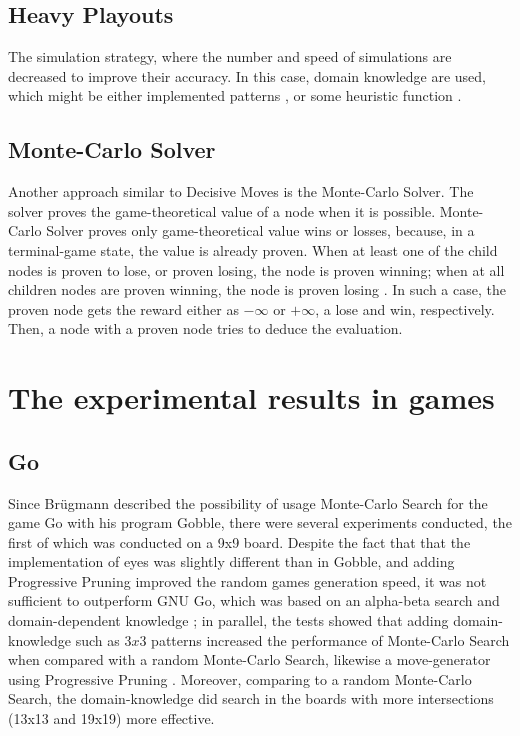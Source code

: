\documentclass[paper=8.27in:11.69in]{scrartcl}
\begin{document}
\subsection{Heavy Playouts}
The simulation strategy, where the number and speed of simulations are decreased to improve their accuracy. In this case, domain knowledge are used, which might be either implemented patterns \cite{Wang2007ModificationsOU}, or some heuristic function \cite{Winands2009EvaluationFB}.\\
\subsection{Monte-Carlo Solver}
Another approach similar to Decisive Moves is the Monte-Carlo Solver. The solver proves the game-theoretical value of a node when it is possible. Monte-Carlo Solver proves only game-theoretical value wins or losses, because, in a terminal-game state, the value is already proven. When at least one of the child nodes is proven to lose, or proven losing, the node is proven winning; when at all children nodes are proven winning, the node is proven losing \cite{WinandsBS08}. In such a case, the proven node gets the reward either as $-\infty$ or $+\infty$, a lose and win, respectively. Then, a node with a proven node tries to deduce the evaluation.\\
\section{The experimental results in games}
\subsection{Go}
Since Brügmann \cite{MaxPlanck1993MonteCG} described the possibility of usage Monte-Carlo Search for the game Go with his program Gobble, there were several experiments conducted, the first of which was conducted on a 9x9 board. Despite the fact that that the implementation of eyes was slightly different than in Gobble, and adding Progressive Pruning improved the random games generation speed, it was not sufficient to outperform GNU Go, which was based on an alpha-beta search and domain-dependent knowledge \cite{Bouzy2003MonteCarloGD}; in parallel, the tests showed that adding domain-knowledge such as $3x3$ patterns increased the performance of Monte-Carlo Search when compared with a random Monte-Carlo Search, likewise a move-generator using Progressive Pruning \cite{Bouzy2005AssociatingDK}. Moreover, comparing to a random Monte-Carlo Search, the domain-knowledge did search in the boards with more intersections (13x13 and 19x19) more effective.
\end{document}
